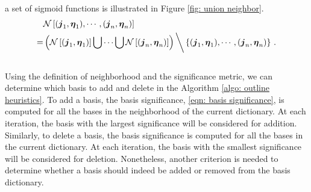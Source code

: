 a set of sigmoid functions
is illustrated in Figure \ref{fig: union neighbor}.
\begin{equation}\begin{split}
    &\mathcal{N}\left[(\boldsymbol{j}_1, \boldsymbol{\eta}_1), \cdots, 
    ( \boldsymbol{j}_n, \boldsymbol{\eta}_n) \right]\\
    = &\left( \mathcal{N}\left[(\boldsymbol{j}_1, \boldsymbol{\eta}_1)\right]\bigcup \cdots 
      \bigcup \mathcal{N}\left[(\boldsymbol{j}_n, \boldsymbol{\eta}_n)\right]\right)
      \bigg\backslash \left\{(\boldsymbol{j}_1, \boldsymbol{\eta}_1), \cdots, 
      ( \boldsymbol{j}_n, \boldsymbol{\eta}_n) \right\}\,.
\label{eqn: multiple neighbor}
\end{split}\end{equation}\\

Using the definition of neighborhood and the significance metric, we can determine which basis
to add and delete in the Algorithm \ref{algo: outline heuristics}. 
To add a basis, the basis significance, \eqref{eqn: basis significance},
is computed for all the bases in the neighborhood of the current dictionary. At each iteration,
the basis with the largest significance will be considered for addition. Similarly, 
to delete a basis, the basis significance is computed for all the bases in the current dictionary.
At each iteration, the basis with the smallest significance will be considered for deletion.
Nonetheless, another criterion is needed to determine whether a basis should indeed
be added or removed from the basis dictionary. \\

